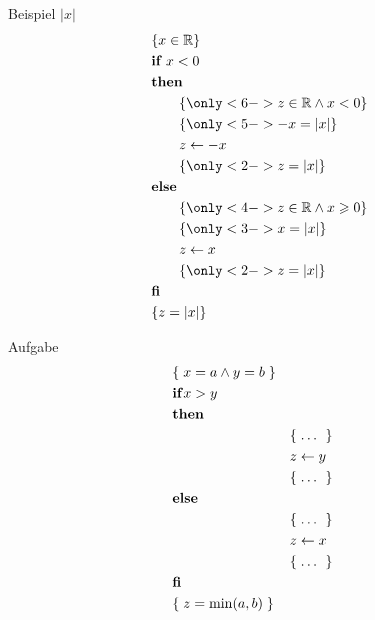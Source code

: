 \begin{frame}{Beispiel $\vert x \vert$}
	\vspace{-10mm}
	\begin{align*}
		&\{ x \in\R\} \\
		&\textbf{if } x < 0 \\
		&\textbf{then } \\
		&\hspace{2em} \{ \only<6->{ z\in\R\wedge x < 0 } \} \\
		&\hspace{2em} \{ \only<5->{ -x = \vert x \vert } \} \\
		&\hspace{2em}  z \leftarrow -x   \\
		&\hspace{2em} \{ \only<2->{ z = \vert x \vert } \} \\
		&\textbf{else} \\
		&\hspace{2em} \{ \only<4->{ z\in\R\wedge x\geq 0 } \} \\
		&\hspace{2em} \{ \only<3->{ x = \vert x \vert } \} \\
		&\hspace{2em} z \leftarrow x \\
		&\hspace{2em} \{ \only<2->{ z = \vert x \vert } \} \\
		&\textbf{fi} \\
		&\{ z = \vert x \vert \} 
	\end{align*}
\end{frame}

\begin{frame}{Aufgabe}
	\vspace{-10mm}
	  \begin{alignat*}{2}
	&\{\;x=a \land y=b\;\}  \\
	&\mathbf{if } x>y  \\
	&\mathbf{then } \\
	&&&\{\; \dots\ \;\} \\
	&&& z \gets y  \\
	&&&\{\; \dots\ \;\} \\
	&\mathbf{else } \\
	&&&\{\; \dots\ \;\} \\
	&&& z \gets x  \\
	&&&\{\; \dots\ \;\} \\
	&\mathbf{fi } \\
	&\{\;z=\min(a,b)\;\}
	\end{alignat*}
\end{frame}

